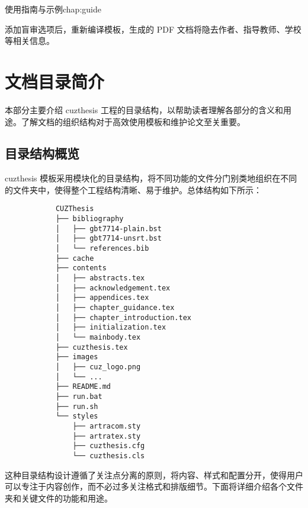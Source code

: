\begin{cuzchapter}{使用指南与示例}{chap:guide}
\begin{listing}[htbp]
    \end{listing}

    添加盲审选项后，重新编译模板，生成的 PDF 文档将隐去作者、指导教师、学校等相关信息。

    \section{文档目录简介}\label{sec:directory}

    本部分主要介绍 cuzthesis 工程的目录结构，以帮助读者理解各部分的含义和用途。了解文档的组织结构对于高效使用模板和维护论文至关重要。

    \subsection{目录结构概览}\label{sub:directory-overview}

    cuzthesis 模板采用模块化的目录结构，将不同功能的文件分门别类地组织在不同的文件夹中，使得整个工程结构清晰、易于维护。总体结构如下所示：

    \begingroup
    \small\linespread{1}
    \begin{center}
        \begin{verbatim}
            CUZThesis
            ├── bibliography
            │   ├── gbt7714-plain.bst
            │   ├── gbt7714-unsrt.bst
            │   └── references.bib
            ├── cache
            ├── contents
            │   ├── abstracts.tex
            │   ├── acknowledgement.tex
            │   ├── appendices.tex
            │   ├── chapter_guidance.tex
            │   ├── chapter_introduction.tex
            │   ├── initialization.tex
            │   └── mainbody.tex
            ├── cuzthesis.tex
            ├── images
            │   ├── cuz_logo.png
            │   └── ...
            ├── README.md
            ├── run.bat
            ├── run.sh
            └── styles
                ├── artracom.sty
                ├── artratex.sty
                ├── cuzthesis.cfg
                └── cuzthesis.cls
        \end{verbatim}
    \end{center}
    \endgroup

    这种目录结构设计遵循了关注点分离的原则，将内容、样式和配置分开，使得用户可以专注于内容创作，而不必过多关注格式和排版细节。下面将详细介绍各个文件夹和关键文件的功能和用途。


\end{cuzchapter}
